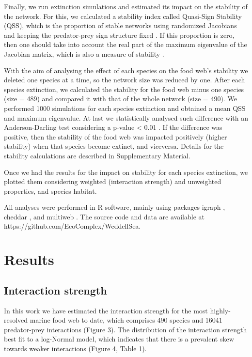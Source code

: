 \documentclass[gc, manuscript]{copernicus}
\begin{document}
Finally, we run extinction simulations and estimated its impact on the
stability of the network. For this, we calculated a stability index
called Quasi-Sign Stability (QSS), which is the proportion of stable
networks using randomized Jacobians and keeping the predator-prey sign
structure fixed \citep{Allesina2008}. If this proportion is zero, then
one should take into account the real part of the maximum eigenvalue of
the Jacobian matrix, which is also a measure of stability
\citep{Grilli2016}.

With the aim of analysing the effect of each species on the food web's
stability we deleted one species at a time, so the network size was
reduced by one. After each species extinction, we calculated the
stability for the food web minus one species (size = 489) and compared
it with that of the whole network (size = 490). We performed 1000
simulations for each species extinction and obtained a mean QSS and
maximum eigenvalue. At last we statistically analysed such difference
with an Anderson-Darling test considering a p-value \textless{} 0.01
\citep{Scholz1987}. If the difference was positive, then the stability
of the food web was impacted positively (higher stability) when that
species become extinct, and viceversa. Details for the stability
calculations are described in Supplementary Material.

Once we had the results for the impact on stability for each species
extinction, we plotted them considering weighted (interaction strength)
and unweighted properties, and species habitat.

All analyses were performed in R software, mainly using packages igraph
\citep{Csardi2005}, cheddar \citep{Hudson2013}, and multiweb
\citep{Saravia2019}. The source code and data are available at
https://github.com/EcoComplex/WeddellSea.

\section{Results}

\subsection{Interaction strength}

In this work we have estimated the interaction strength for the most
highly-resolved marine food web to date, which comprises 490 species and
16041 predator-prey interactions (Figure 3). The distribution of the
interaction strength best fit to a log-Normal model, which indicates
that there is a prevalent skew towards weaker interactions (Figure 4,
Table 1).
\end{document}
